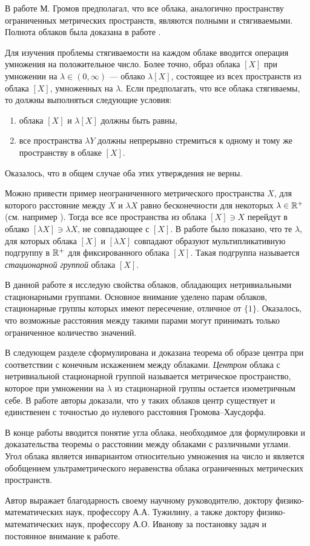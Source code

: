 В работе \cite{gromov_metric_2001} М. Громов предполагал, что все
облака, аналогично пространству ограниченных метрических пространств,
являются полными и стягиваемыми. Полнота облаков была доказана
в работе \cite{TuzhBog1}.

Для изучения проблемы стягиваемости на каждом облаке вводится
операция умножения на положительное число. Более точно, образ облака
\([X] \) при умножении на \( \lambda \in (0, \infty) \) --- облако \(
\lambda [X] \), состоящее из всех пространств из облака \( [X] \),
умноженных на \( \lambda \). Если предполагать, что все облака
стягиваемы, то должны выполняться следующие условия:
\begin{enumerate}
  \item облака \( [X] \) и \( \lambda [X] \) должны
    быть равны,
  \item все пространства \( \lambda Y \) должны непрерывно стремиться
    к одному и тому же пространству в облаке \( [X] \).
\end{enumerate}
Оказалось, что в общем случае оба этих утверждения не верны.

Можно привести пример неограниченного метрического пространства \( X
\), для которого расстояние между \( X \) и \( \lambda X \) равно
бесконечности для некоторых \( \lambda \in \mathbb R^+ \)(см. например
\cite{TuzhBog1}). Тогда все все пространства из облака \( [X] \ni X\)
перейдут в облако \( [\lambda X] \ni \lambda X \), не совпадающее с
\( [X] \). В работе \cite{TuzhBog2} было показано, что те \( \lambda
\), для которых облака \( [X] \) и \( [\lambda X] \) совпадают
образуют мультипликативную подгруппу в \( \mathbb R^+ \) для фиксированного
облака \( [X] \). Такая подгруппа называется \emph{стационарной
группой} облака \( [X] \).

В данной работе я исследую свойства облаков, обладающих
нетривиальными стационарными группами. Основное внимание уделено
парам облаков, стационарные группы которых имеют пересечение,
отличное от \( \{1\} \). Оказалось, что возможные расстояния между
такими парами могут принимать только ограниченное количество значений.

В следующем разделе сформулирована и доказана теорема об образе
центра при соответствии с конечным искажением между облаками.
\emph{Центром} облака с нетривиальной стационарной группой называется
метрическое пространство, которое при умножении на \( \lambda \) из
стационарной группы остается изометричным себе. В работе
\cite{TuzhBog2} авторы доказали, что у таких облаков центр существует
и единственен с точностью до нулевого расстояния Громова--Хаусдорфа.

В конце работы вводится понятие угла облака, необходимое для
формулировки и доказательства теоремы о расстоянии между облаками с
различными углами. Угол облака является инвариантом относительно
умножения на число и является обобщением ультраметрического
неравенства облака ограниченных метрических пространств.

Автор выражает благодарность своему научному руководителю, доктору
физико-математических наук, профессору А.А. Тужилину, а также доктору
физико-математических наук,
профессору А.О. Иванову за постановку задач и постоянное внимание к работе.
